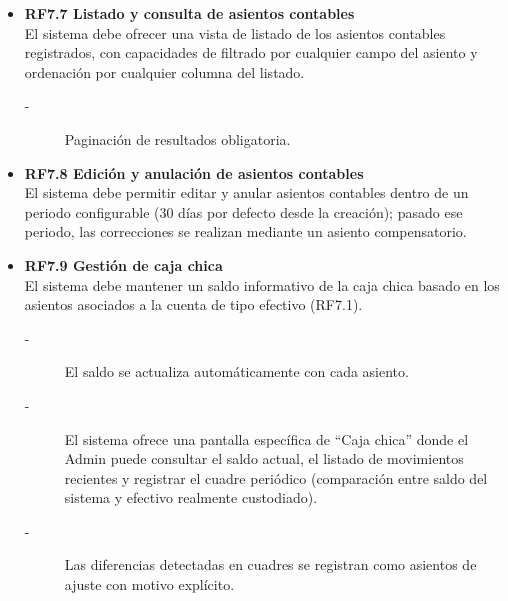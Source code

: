 \begin{itemize}
    \item \textbf{RF7.7 Listado y consulta de asientos contables} \\
    El sistema debe ofrecer una vista de listado de los asientos
    contables registrados, con capacidades de filtrado por cualquier campo del asiento 
    y ordenación por cualquier columna del listado.
    \begin{description}
        \item[-] Paginación de resultados obligatoria.
    \end{description}

    \item \textbf{RF7.8 Edición y anulación de asientos contables} \\
    El sistema debe permitir editar y anular asientos contables dentro de
    un periodo configurable (30 días por defecto desde la creación); pasado ese periodo, las correcciones se
    realizan mediante un asiento compensatorio.


    \item \textbf{RF7.9 Gestión de caja chica} \\
    El sistema debe mantener un saldo informativo de la caja chica
    basado en los asientos asociados a la cuenta de tipo efectivo
    (RF7.1).
    \begin{description}
        \item[-] El saldo se actualiza automáticamente con cada asiento.
        \item[-] El sistema ofrece una pantalla específica de ``Caja chica'' donde el 
                Admin puede consultar el saldo actual, el listado de movimientos 
                recientes y registrar el cuadre periódico (comparación entre saldo 
                del sistema y efectivo realmente custodiado).
        \item[-] Las diferencias detectadas en cuadres se registran como asientos de ajuste con motivo explícito.
    \end{description}



\end{itemize}
